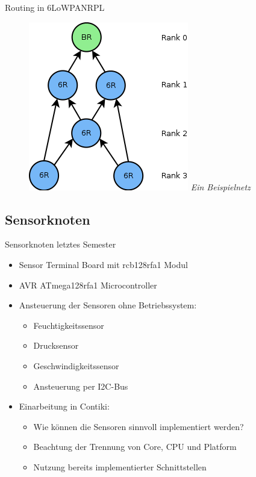 \begin{frame}{Routing in 6LoWPAN}{RPL}
	\begin{figure}
	\centering
	\includegraphics[width=0.5\linewidth]{Dodag}
	\linebreak
	\emph{Ein Beispielnetz}
	\end{figure}
\end{frame}
\subsection{Sensorknoten}

\begin{frame}{Sensorknoten letztes Semester}
	\begin{itemize}
	\item 	Sensor Terminal Board
			mit rcb128rfa1 Modul
	\item 	AVR ATmega128rfa1 Microcontroller
	\item 	Ansteuerung der Sensoren
			ohne Betriebssystem:
			\begin{itemize}
			\item 	Feuchtigkeitssensor
			\item 	Drucksensor
			\item 	Geschwindigkeitssensor
			\item 	Ansteuerung per I2C-Bus
			\end{itemize}
	\item 	Einarbeitung in Contiki:
			\begin{itemize}
			\item 	Wie können die Sensoren sinnvoll implementiert werden?
			\item 	Beachtung der Trennung von
					Core, CPU und Platform
			\item 	Nutzung bereits implementierter Schnittstellen
			\end{itemize}
	\end{itemize}
\end{frame}

